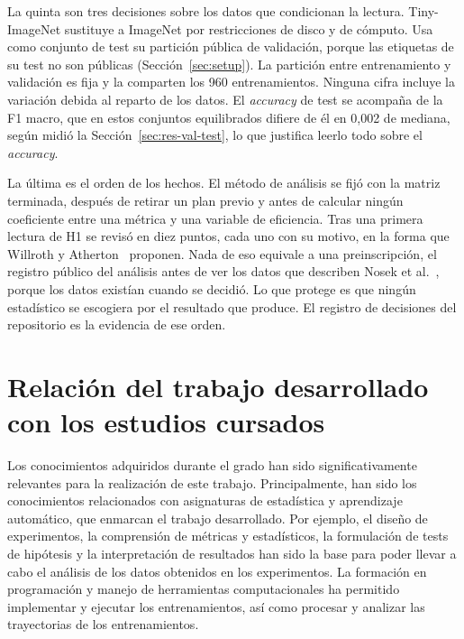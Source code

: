 La quinta son tres decisiones sobre los datos que condicionan la lectura. Tiny-ImageNet sustituye a ImageNet por restricciones de disco y de cómputo. Usa como conjunto de test su partición pública de validación, porque las etiquetas de su test no son públicas (Sección~\ref{sec:setup}). La partición entre entrenamiento y validación es fija y la comparten los 960 entrenamientos. Ninguna cifra incluye la variación debida al reparto de los datos. El \emph{accuracy} de test se acompaña de la F1 macro, que en estos conjuntos equilibrados difiere de él en 0,002 de mediana, según midió la Sección~\ref{sec:res-val-test}, lo que justifica leerlo todo sobre el \emph{accuracy}.

La última es el orden de los hechos. El método de análisis se fijó con la matriz terminada, después de retirar un plan previo y antes de calcular ningún coeficiente entre una métrica y una variable de eficiencia. Tras una primera lectura de H1 se revisó en diez puntos, cada uno con su motivo, en la forma que Willroth y Atherton~\cite{willroth2024best} proponen. Nada de eso equivale a una preinscripción, el registro público del análisis antes de ver los datos que describen Nosek et al.~\cite{nosek2018preregistration}, porque los datos existían cuando se decidió. Lo que protege es que ningún estadístico se escogiera por el resultado que produce. El registro de decisiones del repositorio es la evidencia de ese orden.

\section{Relación del trabajo desarrollado con los estudios cursados}
\label{sec:concl-estudios}

Los conocimientos adquiridos durante el grado han sido significativamente relevantes para la realización de este trabajo. Principalmente, han sido los conocimientos relacionados con asignaturas de estadística y aprendizaje automático, que enmarcan el trabajo desarrollado. Por ejemplo, el diseño de experimentos, la comprensión de métricas y estadísticos, la formulación de tests de hipótesis y la interpretación de resultados han sido la base para poder llevar a cabo el análisis de los datos obtenidos en los experimentos. La formación en programación y manejo de herramientas computacionales ha permitido implementar y ejecutar los entrenamientos, así como procesar y analizar las trayectorias de los entrenamientos.

